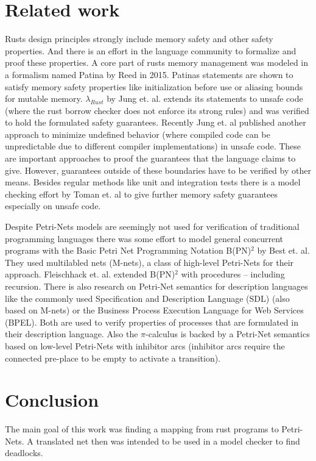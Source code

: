 \chapter{Related work}
Rusts design principles strongly include memory safety and other safety properties.
And there is an effort in the language community to formalize and proof these properties.
A core part of rusts memory management was modeled in a formalism named Patina by Reed\cite{reed2015patina} in 2015.
Patinas statements are shown to satisfy memory safety properties like initialization before use or aliasing bounds for mutable memory.
$\lambda_{Rust}$ by Jung et. al.\cite{Jung:2017:RSF:3177123.3158154} extends its statements to unsafe code (where the rust borrow checker does not enforce its strong rules) and was verified to hold the formulated safety guarantees.
Recently Jung et. al published another approach to minimize undefined behavior (where compiled code can be unpredictable due to different compiler implementations) in unsafe code.
These are important approaches to proof the guarantees that the language claims to give.
However, guarantees outside of these boundaries have to be verified by other means.
Besides regular methods like unit and integration tests there is a model checking effort by Toman et. al \cite{toman2015crust} to give further memory safety guarantees especially on unsafe code.

Despite Petri-Nets models are seemingly not used for verification of traditional programming languages there was some effort to model general concurrent programs with the Basic Petri Net Programming Notation B(PN)$^2$ by Best et. al\cite{Best1993BPN2A}.
They used multilabled nets (M-nets)\cite{best1995class}, a class of high-level Petri-Nets for their approach.
Fleischhack et. al. extended B(PN)$^2$ with procedures -- including recursion\cite{fleischhack1997petri}.
There is also research on Petri-Net semantics for description languages like the commonly used Specification and Description Language (SDL)\cite{fleischhack1998compositional} (also based on M-nets) or the Business Process Execution Language for Web Services (BPEL)\cite{stahl2005petri}\cite{lohmann2007feature}.
Both are used to verify properties of processes that are formulated in their description language.
Also the $\pi$-calculus is backed by a Petri-Net semantics\cite{busi1995petri} based on low-level Petri-Nets with inhibitor arcs (inhibitor arcs require the connected pre-place to be empty to activate a transition).

\chapter{Conclusion}
\label{conclusion}
The main goal of this work was finding a mapping from rust programs to Petri-Nets.
A translated net then was intended to be used in a model checker to find deadlocks.

